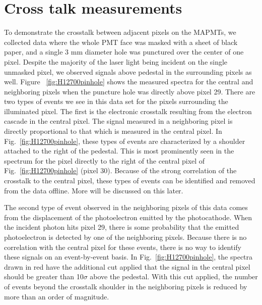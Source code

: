 \section{Cross talk measurements}

To demonstrate the crosstalk between adjacent pixels on the MAPMTs, we collected data where the whole PMT face was masked with a sheet of black paper, and a single 3 mm diameter hole was punctured over the center of one pixel. Despite the majority of the laser light being incident on the single unmasked pixel, we observed signals above pedestal in the surrounding pixels as well. Figure ~\ref{fig:H12700pinhole} shows the measured spectra for the central and neighboring pixels when the puncture hole was directly above pixel 29. There are two types of events we see in this data set for the pixels surrounding the illuminated pixel. The first is the electronic crosstalk resulting from the electron cascade in the central pixel. The signal measured in a neighboring pixel is directly proportional to that which is measured in the central pixel. In Fig.~\ref{fig:H12700pinhole}, these types of events are characterized by a shoulder attached to the right of the pedestal. This is most prominently seen in the spectrum for the pixel directly to the right of the central pixel of Fig.~\ref{fig:H12700pinhole} (pixel 30). Because of the strong correlation of the crosstalk to the central pixel, these types of events can be identified and removed from the data offline. More will be discussed on this later.

The second type of event observed in the neighboring pixels of this data comes from the displacement of the photoelectron emitted by the photocathode. When the incident photon hits pixel 29, there is some probability that the emitted photoelectron is detected by one of the neighboring pixels. Because there is no correlation with the central pixel for these events, there is no way to identify these signals on an event-by-event basis. In Fig.~\ref{fig:H12700pinhole}, the spectra drawn in red have the additional cut applied that the signal in the central pixel should be greater than 10$\sigma$ above the pedestal. With this cut applied, the number of events beyond the crosstalk shoulder in the neighboring pixels is reduced by more than an order of magnitude.



